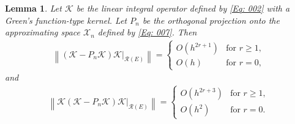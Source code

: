\documentclass[pdflatex, sn-mathphys-num]{sn-jnl}%
\newcommand{\norm}[1]{\left\lVert #1\right\rVert}
\theoremstyle{thmstyleone}%
\newtheorem{lemma}[theorem]{Lemma}
\theoremstyle{thmstyletwo}%
\theoremstyle{thmstylethree}%
\begin{document}
\begin{lemma} \label{lem1}
	Let $ \mathcal{K}$ be the linear integral operator defined by \eqref{Eq: 002} with a Green's function-type kernel. Let $P_n$ be the orthogonal projection onto the approximating space $\mathcal{X}_n$ defined by \eqref{Eq: 007}. Then 
	\begin{eqnarray*} 
		\norm{(\mathcal{K} - P_n \mathcal{K}) \mathcal{K} |_{\mathcal{R}(E)} } = 	\begin{cases}
			O\left(h^{2r+1}\right) & \text{for } r \geq 1, \\
			O\left(h\right) & \text{for } r = 0,
		\end{cases}
	\end{eqnarray*}
	and	
	\begin{eqnarray*}
		\norm{ \mathcal{K} (\mathcal{K} - P_n \mathcal{K}) \mathcal{K} |_{\mathcal{R}(E)} } =
		\begin{cases}
			O\left(h^{2r+3}\right) & \text{for } r \geq 1, \\
			O\left(h^{2}\right) & \text{for } r = 0.
		\end{cases}
	\end{eqnarray*}
\end{lemma}
\end{document}
